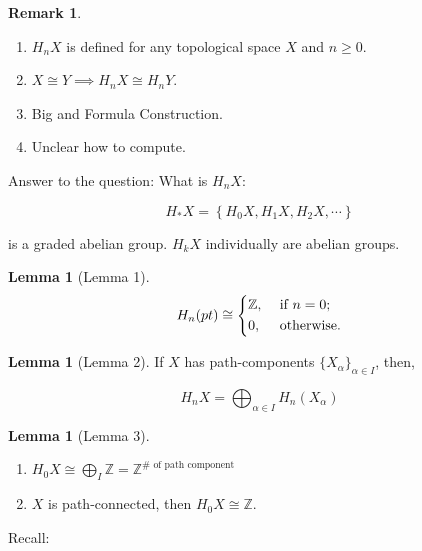 \documentclass{article}
\theoremstyle{definition}
\newtheorem{lemma}[theorem]{Lemma}
\newtheorem*{remark}{Remark}
\begin{document}
    \begin{remark}
        \begin{enumerate}[label=\arabic*)]
            \item \(H_n X\) is defined for any topological space \(X\) and \(n \geq 0\).
            
            \item \(X \cong Y \implies H_n X \cong H_n Y\).
            
            \item Big and Formula Construction.
            
            \item Unclear how to compute.
        \end{enumerate} 
    \end{remark}

    Answer to the question: What is \(H_n X\):

    \[
        H_{\ast} X = \left\{ H_0 X, H_1 X, H_2 X , \cdots  \right\} 
    \]

    is a graded abelian group. \(H_k X\) individually are abelian groups.

    \begin{lemma}[Lemma 1]
        \[
            H_n(pt) \cong \begin{dcases}
                \mathbb{Z}, &\text{ if } n = 0 ;\\
                0, &\text{ otherwise} .
            \end{dcases}
        \]
    \end{lemma}

    \begin{lemma}[Lemma 2]
        If \(X\) has path-components \(\{ X_\alpha \}_{\alpha \in I}\), then,

        \[
            H_n X = \bigoplus_{\alpha \in I} H_n (X_\alpha)
        \]
    \end{lemma}

    \begin{lemma}
        [Lemma 3]
        \begin{enumerate}[label=\alph*)]
            \item \( H_0 X \cong \bigoplus_{I} \mathbb{Z} = \mathbb{Z}^{\# \text{ of path component}}\)
            \item \(X\) is path-connected, then \(H_0 X \cong \mathbb{Z}\).
        \end{enumerate} 
    \end{lemma}

    Recall:
\end{document}
